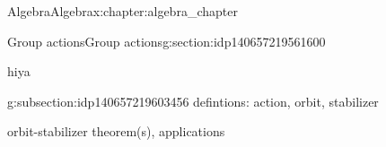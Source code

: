 \documentclass[oneside,10pt,]{book}
\numberwithin{equation}{section}
\begin{document}
\begin{chapterptx}{Algebra}{}{Algebra}{}{}{x:chapter:algebra_chapter}
\typeout{************************************************}
%
\begin{sectionptx}{Group actions}{}{Group actions}{}{}{g:section:idp140657219561600}
\begin{introduction}{}%
hiya\end{introduction}%
%
%
\typeout{************************************************}
\typeout{************************************************}
%
\begin{subsectionptx}{}{}{}{}{}{g:subsection:idp140657219603456}
defintions: action, orbit, stabilizer%
\par
orbit-stabilizer theorem(s), applications%
\end{subsectionptx}
\end{sectionptx}
\end{chapterptx}
%
%
\typeout{************************************************}
\typeout{************************************************}
%
\end{document}
